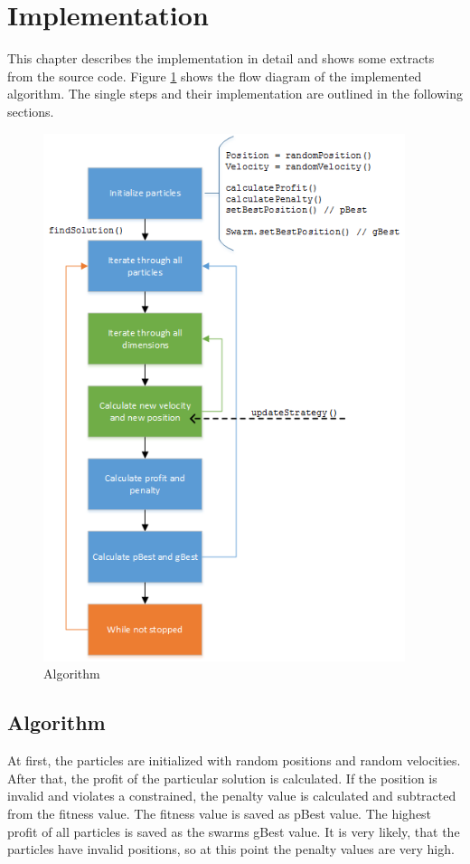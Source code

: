 \documentclass{article}
\begin{document}
\section{Implementation}
\label{lbl-impl}
This chapter describes the implementation in detail and shows some extracts from the source code. Figure \ref{fig-algo} shows the flow diagram of the implemented algorithm. The single steps and their implementation are outlined in the following sections.

\begin{figure}[H]
    \centering
    \includegraphics[width=400px]{images/algo.png}
    \caption{Algorithm}
    \label{fig-algo}
\end{figure}

\newpage

\subsection{Algorithm}
At first, the particles are initialized with random positions and random velocities. After that, the profit of the particular solution is calculated. If the position is invalid and violates a constrained, the penalty value is calculated and subtracted from the fitness value. The fitness value is saved as pBest value. The highest profit of all particles is saved as the swarms gBest value. It is very likely, that the particles have invalid positions, so at this point the penalty values are very high.\\
\end{document}
